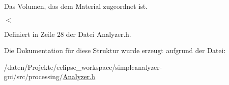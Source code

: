 Das Volumen, das dem Material zugeordnet ist. 

$<$ 

Definiert in Zeile 28 der Datei Analyzer.\-h.



Die Dokumentation für diese Struktur wurde erzeugt aufgrund der Datei\-:\begin{DoxyCompactItemize}
\item 
/daten/\-Projekte/eclipse\-\_\-workspace/simpleanalyzer-\/gui/src/processing/\hyperlink{Analyzer_8h}{Analyzer.\-h}\end{DoxyCompactItemize}
